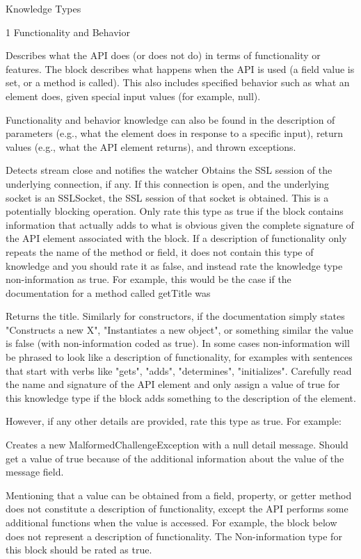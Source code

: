Knowledge Types

1 Functionality and Behavior

Describes what the API does (or does not do) in terms of functionality or features. The block describes what happens when the API is used (a field value is set, or a method is called). This also includes specified behavior such as what an element does, given special input values (for example, null).

Functionality and behavior knowledge can also be found in the description of parameters (e.g., what the element does in response to a specific input), return values (e.g., what the API element returns), and thrown exceptions.

Detects stream close and notifies the watcher
Obtains the SSL session of the underlying connection, if any. If this connection is open, and the underlying socket is an SSLSocket, the SSL session of that socket is obtained. This is a potentially blocking operation.
Only rate this type as true if the block contains information that actually adds to what is obvious given the complete signature of the API element associated with the block. If a description of functionality only repeats the name of the method or field, it does not contain this type of knowledge and you should rate it as false, and instead rate the knowledge type non-information as true. For example, this would be the case if the documentation for a method called getTitle was

Returns the title.
Similarly for constructors, if the documentation simply states "Constructs a new X", "Instantiates a new object", or something similar the value is false (with non-information coded as true). In some cases non-information will be phrased to look like a description of functionality, for examples with sentences that start with verbs like "gets", "adds", "determines", "initializes". Carefully read the name and signature of the API element and only assign a value of true for this knowledge type if the block adds something to the description of the element.

However, if any other details are provided, rate this type as true. For example:

Creates a new MalformedChallengeException with a null detail message.
Should get a value of true because of the additional information about the value of the message field.

Mentioning that a value can be obtained from a field, property, or getter method does not constitute a description of functionality, except the API performs some additional functions when the value is accessed. For example, the block below does not represent a description of functionality. The Non-information type for this block should be rated as true.

